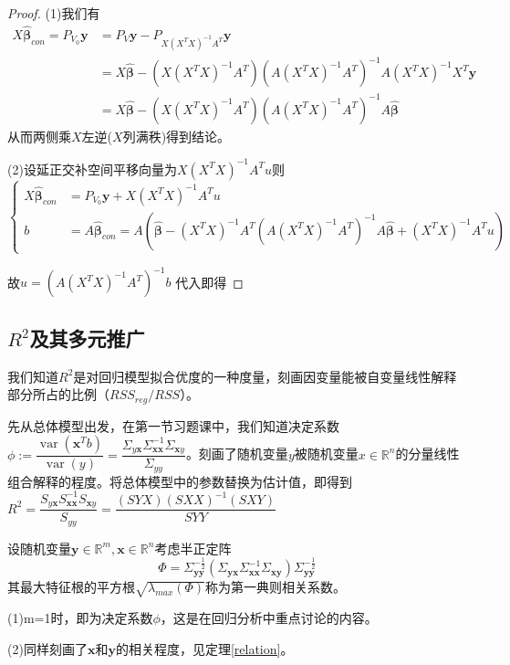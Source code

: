 \documentclass[cn,hazy,green,12pt,normal]{elegantnote}
\DeclareMathOperator{\var}{var}
\newcommand{\MR}{\mathbb R}
\numberwithin{equation}{section}
\numberwithin{subsection}{section}
\begin{document}
\begin{proof}
(1)我们有
\begin{align*}
    X\hat{\bm\beta}_{con}=P_{V_0}\bm y &= P_{V}\bm y - P_{X(X^TX)^{-1}A^T}\bm y\\
    &=X\hat{\bm\beta}-(X(X^TX)^{-1}A^T)(A(X^TX)^{-1}A^T)^{-1}A(X^TX)^{-1}X^T\bm y \\
    &=X\hat{\bm\beta}-(X(X^TX)^{-1}A^T)(A(X^TX)^{-1}A^T)^{-1}A\hat{\bm\beta}
\end{align*}  
从而两侧乘$X$左逆($X$列满秩)得到结论。

\noindent (2)设延正交补空间平移向量为$X(X^TX)^{-1}A^T u$则
\[
\begin{cases}
    X\hat{\bm\beta}_{con}&=P_{V_0}\bm y+X(X^TX)^{-1}A^T u\\
    b&=A\hat{\bm\beta}_{con}=A(\hat{\bm\beta} - (X^TX)^{-1}A^T(A(X^TX)^{-1}A^T)^{-1}A\hat{\bm\beta}+(X^TX)^{-1}A^Tu)
\end{cases}
\]

故$u=(A(X^TX)^{-1}A^T)^{-1}b$
代入即得
\end{proof}
\subsection[测定系数及其多元推广]{$R^2$及其多元推广}
我们知道$R^2$是对回归模型拟合优度的一种度量，刻画因变量能被自变量线性解释部分所占的比例（$RSS_{reg}/RSS$）。

先从总体模型出发，在第一节习题课中，我们知道决定系数$\phi:=\dfrac{\var(\bm x^T b)}{\var (y)}=\dfrac{\Sigma_{y\bm x}\Sigma_{\bm x\bm x}^{-1}\Sigma_{\bm x y}}{\Sigma_{yy}}$。刻画了随机变量$y$被随机变量$x\in \MR^n$的分量线性组合解释的程度。将总体模型中的参数替换为估计值，即得到$R^2=\dfrac{S_{y\bm x}S_{\bm x\bm x}^{-1}S_{\bm x y}}{S_{yy}}=\dfrac{(SYX) (SXX)^{-1}(SXY)}{SYY}$

\begin{definition}
    设随机变量$\bm y \in \MR^m,\bm x \in \MR^n$考虑半正定阵\[\Phi =\Sigma_{\bm y\bm y}^{-\frac{1}{2}}(\Sigma_{\bm y\bm x}\Sigma_{\bm x\bm x}^{-1}\Sigma_{\bm x\bm y})\Sigma_{\bm y \bm y}^{-\frac{1}{2}}\]
    其最大特征根的平方根$\sqrt{\lambda_{max}(\Phi)}$称为第一典则相关系数。
\end{definition}

\begin{remark}
    (1)m=1时，即为决定系数$\phi$，这是在回归分析中重点讨论的内容。
    
    \noindent (2)同样刻画了$\bm x$和$\bm y$的相关程度，见定理\ref{relation}。
\end{remark}
\end{document}
